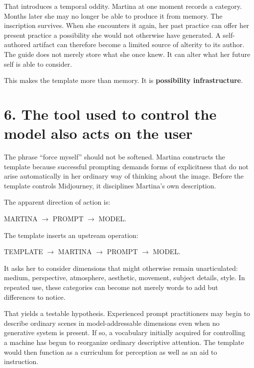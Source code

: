 \documentclass[
  11pt,
  letterpaper,
]{article}
\begin{document}
That introduces a temporal oddity. Martina at one moment records a
category. Months later she may no longer be able to produce it from
memory. The inscription survives. When she encounters it again, her past
practice can offer her present practice a possibility she would not
otherwise have generated. A self-authored artifact can therefore become
a limited source of alterity to its author. The guide does not merely
store what she once knew. It can alter what her future self is able to
consider.

This makes the template more than memory. It is \textbf{possibility
infrastructure}.

\section{6. The tool used to control the model also acts on the
user}\label{the-tool-used-to-control-the-model-also-acts-on-the-user}

The phrase ``force myself'' should not be softened. Martina constructs
the template because successful prompting demands forms of explicitness
that do not arise automatically in her ordinary way of thinking about
the image. Before the template controls Midjourney, it disciplines
Martina's own description.

The apparent direction of action is:

\begin{center}
MARTINA $\rightarrow$ PROMPT $\rightarrow$ MODEL.
\end{center}

The template inserts an upstream operation:

\begin{center}
TEMPLATE $\rightarrow$ MARTINA $\rightarrow$ PROMPT $\rightarrow$ MODEL.
\end{center}

It asks her to consider dimensions that might otherwise remain
unarticulated: medium, perspective, atmosphere, aesthetic, movement,
subject details, style. In repeated use, these categories can become not
merely words to add but differences to notice.

That yields a testable hypothesis. Experienced prompt practitioners may
begin to describe ordinary scenes in model-addressable dimensions even
when no generative system is present. If so, a vocabulary initially
acquired for controlling a machine has begun to reorganize ordinary
descriptive attention. The template would then function as a curriculum
for perception as well as an aid to instruction.
\end{document}
